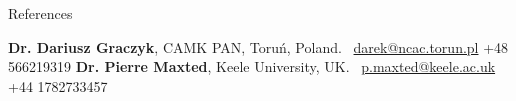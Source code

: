 
\prefix{}
\begin{rubric}{References}

\entry*[1]
    \textbf{Dr. Dariusz Graczyk}, CAMK PAN, Toru\'n, Poland. \hspace{2pt} \textcolor{MarkerColour}{\faEnvelopeO}~\url{darek@ncac.torun.pl} \hspace{8pt} \textcolor{MarkerColour}{\faPhone} +48 566219319
\entry*[2]
    \textbf{Dr. Pierre Maxted}, Keele University, UK. \hspace{50.7pt} \textcolor{MarkerColour}{\faEnvelopeO}~\url{p.maxted@keele.ac.uk} \hspace{4.9pt} \textcolor{MarkerColour}{\faPhone} +44 1782733457
%
%
\end{rubric}
